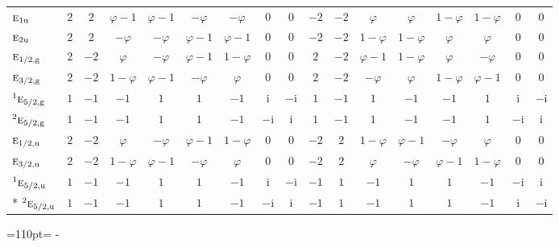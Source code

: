 \documentclass[10pt,a4paper]{article}
\makeatletter
\def\grouprule#1#2{\noalign{\marks\LTgroupmarks{\the\belowrulesep}\nobreak\vskip#1%
  \vskip\aboverulesep}\multispan\LT@cols\unskip{\leaders\hrule\@height#2\hfill\kern\z@}\cr
  \noalign{\penalty\LTrulebreak\vskip\belowrulesep\global\@lastruleclass\z@}}
\newcommand{\needspace}[1]{\par\penalty-100\begingroup\dimen0=#1\relax\dimen2=\pagegoal
  \advance\dimen2-\pagetotal\ifdim\dimen0>\dimen2\relax\ifdim\dimen2>0pt\vfil\break\fi\fi
  \endgroup}
\numberwithin{equation}{section}
\newcommand{\irr}[1]{\text{\normalfont\scshape #1}}
\newcommand{\conjpair}[1]{{}^{#1}}
\newcommand{\ptag}[1]{\mathrm{#1}}
\newcommand{\iunit}{\mathrm{i}}
\newcommand{\goldenratio}{\varphi}
\makeatother
\begin{document}
{\begin{longtable}{@{}lcccccccccccccccc@{}}
$\irr{e}_{1\ptag{u}}$ & $2$ & $2$ & $\goldenratio - 1$ & $\goldenratio - 1$ & $-\goldenratio{}$ & $-\goldenratio{}$ & $0$ & $0$ & $-2$ & $-2$ & $\goldenratio{}$ & $\goldenratio{}$ & $1 - \goldenratio{}$ & $1 - \goldenratio{}$ & $0$ & $0$\\
$\irr{e}_{2\ptag{u}}$ & $2$ & $2$ & $-\goldenratio{}$ & $-\goldenratio{}$ & $\goldenratio - 1$ & $\goldenratio - 1$ & $0$ & $0$ & $-2$ & $-2$ & $1 - \goldenratio{}$ & $1 - \goldenratio{}$ & $\goldenratio{}$ & $\goldenratio{}$ & $0$ & $0$\\
\grouprule{0pt}{\lightrulewidth}
$\irr{e}_{1/2,\ptag{g}}$ & $2$ & $-2$ & $\goldenratio{}$ & $-\goldenratio{}$ & $\goldenratio - 1$ & $1 - \goldenratio{}$ & $0$ & $0$ & $2$ & $-2$ & $\goldenratio - 1$ & $1 - \goldenratio{}$ & $\goldenratio{}$ & $-\goldenratio{}$ & $0$ & $0$\\
$\irr{e}_{3/2,\ptag{g}}$ & $2$ & $-2$ & $1 - \goldenratio{}$ & $\goldenratio - 1$ & $-\goldenratio{}$ & $\goldenratio{}$ & $0$ & $0$ & $2$ & $-2$ & $-\goldenratio{}$ & $\goldenratio{}$ & $1 - \goldenratio{}$ & $\goldenratio - 1$ & $0$ & $0$\\
$\conjpair{1}\irr{e}_{5/2,\ptag{g}}$ & $1$ & $-1$ & $-1$ & $1$ & $1$ & $-1$ & $\iunit{}$ & $-\iunit{}$ & $1$ & $-1$ & $1$ & $-1$ & $-1$ & $1$ & $\iunit{}$ & $-\iunit{}$\\
$\conjpair{2}\irr{e}_{5/2,\ptag{g}}$ & $1$ & $-1$ & $-1$ & $1$ & $1$ & $-1$ & $-\iunit{}$ & $\iunit{}$ & $1$ & $-1$ & $1$ & $-1$ & $-1$ & $1$ & $-\iunit{}$ & $\iunit{}$\\
$\irr{e}_{1/2,\ptag{u}}$ & $2$ & $-2$ & $\goldenratio{}$ & $-\goldenratio{}$ & $\goldenratio - 1$ & $1 - \goldenratio{}$ & $0$ & $0$ & $-2$ & $2$ & $1 - \goldenratio{}$ & $\goldenratio - 1$ & $-\goldenratio{}$ & $\goldenratio{}$ & $0$ & $0$\\
$\irr{e}_{3/2,\ptag{u}}$ & $2$ & $-2$ & $1 - \goldenratio{}$ & $\goldenratio - 1$ & $-\goldenratio{}$ & $\goldenratio{}$ & $0$ & $0$ & $-2$ & $2$ & $\goldenratio{}$ & $-\goldenratio{}$ & $\goldenratio - 1$ & $1 - \goldenratio{}$ & $0$ & $0$\\
$\conjpair{1}\irr{e}_{5/2,\ptag{u}}$ & $1$ & $-1$ & $-1$ & $1$ & $1$ & $-1$ & $\iunit{}$ & $-\iunit{}$ & $-1$ & $1$ & $-1$ & $1$ & $1$ & $-1$ & $-\iunit{}$ & $\iunit{}$\\*
$\conjpair{2}\irr{e}_{5/2,\ptag{u}}$ & $1$ & $-1$ & $-1$ & $1$ & $1$ & $-1$ & $-\iunit{}$ & $\iunit{}$ & $-1$ & $1$ & $-1$ & $1$ & $1$ & $-1$ & $\iunit{}$ & $-\iunit{}$\\
\bottomrule\end{longtable}}
\needspace{110pt}
\end{document}

